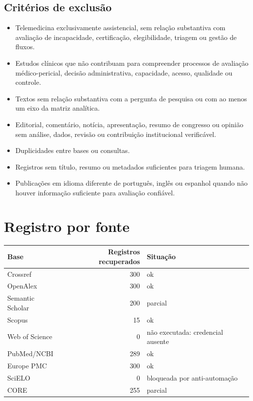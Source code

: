 \documentclass[12pt,a4paper]{article}
\begin{document}
\subsection{Critérios de exclusão}
\label{sec:orge9375fa}
\begin{itemize}
\item Telemedicina exclusivamente assistencial, sem relação substantiva com avaliação de incapacidade, certificação, elegibilidade, triagem ou gestão de fluxos.
\item Estudos clínicos que não contribuam para compreender processos de avaliação médico-pericial, decisão administrativa, capacidade, acesso, qualidade ou controle.
\item Textos sem relação substantiva com a pergunta de pesquisa ou com ao menos um eixo da matriz analítica.
\item Editorial, comentário, notícia, apresentação, resumo de congresso ou opinião sem análise, dados, revisão ou contribuição institucional verificável.
\item Duplicidades entre bases ou consultas.
\item Registros sem título, resumo ou metadados suficientes para triagem humana.
\item Publicações em idioma diferente de português, inglês ou espanhol quando não houver informação suficiente para avaliação confiável.
\end{itemize}

\section{Registro por fonte}
\label{sec:orgf89172a}
\begin{center}
\begin{tabular}{lrl}
Base & Registros recuperados & Situação\\
\hline
Crossref & 300 & ok\\
OpenAlex & 300 & ok\\
Semantic Scholar & 200 & parcial\\
Scopus & 15 & ok\\
Web of Science & 0 & não executada: credencial ausente\\
PubMed/NCBI & 289 & ok\\
Europe PMC & 300 & ok\\
SciELO & 0 & bloqueada por anti-automação\\
CORE & 255 & parcial\\
\end{tabular}
\end{center}
\end{document}
